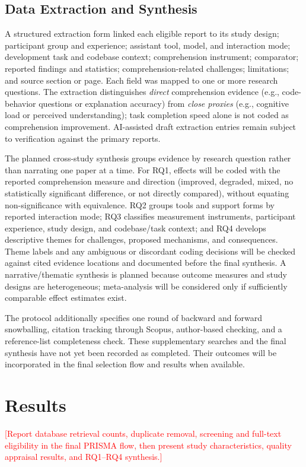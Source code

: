 \documentclass[conference]{IEEEtran}
\newcommand{\todo}[1]{\textcolor{red}{[#1]}}
\begin{document}
\subsection{Data Extraction and Synthesis}
A structured extraction form linked each eligible report to its study design; participant group and experience; assistant tool, model, and interaction mode; development task and codebase context; comprehension instrument; comparator; reported findings and statistics; comprehension-related challenges; limitations; and source section or page. Each field was mapped to one or more research questions. The extraction distinguishes \emph{direct} comprehension evidence (e.g., code-behavior questions or explanation accuracy) from \emph{close proxies} (e.g., cognitive load or perceived understanding); task completion speed alone is not coded as comprehension improvement. AI-assisted draft extraction entries remain subject to verification against the primary reports.

The planned cross-study synthesis groups evidence by research question rather than narrating one paper at a time. For RQ1, effects will be coded with the reported comprehension measure and direction (improved, degraded, mixed, no statistically significant difference, or not directly compared), without equating non-significance with equivalence. RQ2 groups tools and support forms by reported interaction mode; RQ3 classifies measurement instruments, participant experience, study design, and codebase/task context; and RQ4 develops descriptive themes for challenges, proposed mechanisms, and consequences. Theme labels and any ambiguous or discordant coding decisions will be checked against cited evidence locations and documented before the final synthesis. A narrative/thematic synthesis is planned because outcome measures and study designs are heterogeneous; meta-analysis will be considered only if sufficiently comparable effect estimates exist.

The protocol additionally specifies one round of backward and forward snowballing, citation tracking through Scopus, author-based checking, and a reference-list completeness check. These supplementary searches and the final synthesis have not yet been recorded as completed. Their outcomes will be incorporated in the final selection flow and results when available.

\section{Results}\label{sec:results}
\todo{Report database retrieval counts, duplicate removal, screening and full-text eligibility in the final PRISMA flow, then present study characteristics, quality appraisal results, and RQ1--RQ4 synthesis.}
\end{document}
